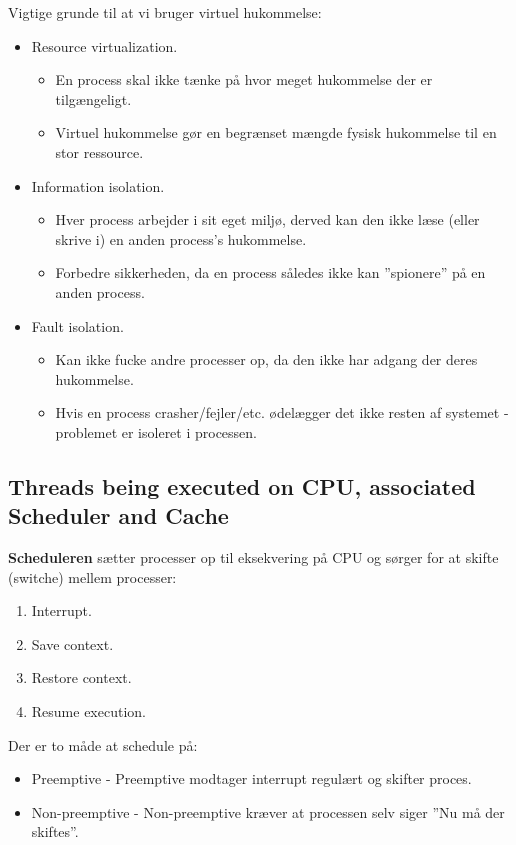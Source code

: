 Vigtige grunde til at vi bruger virtuel hukommelse:

\begin{itemize}
	\item Resource virtualization.
	\begin{itemize}
		\item En process skal ikke tænke på hvor meget hukommelse der er tilgængeligt.
		\item Virtuel hukommelse gør en begrænset mængde fysisk hukommelse til en stor ressource.
	\end{itemize}
	\item Information isolation.
	\begin{itemize}
		\item Hver process arbejder i sit eget miljø, derved kan den ikke læse (eller skrive i) en anden process's hukommelse.
		\item Forbedre sikkerheden, da en process således ikke kan ''spionere'' på en anden process.
	\end{itemize}
	\item Fault isolation.
	\begin{itemize}
		\item Kan ikke fucke andre processer op, da den ikke har adgang der deres hukommelse.
		\item Hvis en process crasher/fejler/etc. ødelægger det ikke resten af systemet - problemet er isoleret i processen.
	\end{itemize}
\end{itemize}

\subsection{Threads being executed on CPU, associated Scheduler and Cache}
\textbf{Scheduleren} sætter processer op til eksekvering på CPU og sørger for at skifte (switche) mellem processer:

\begin{enumerate}
	\item Interrupt.
	\item Save context.
	\item Restore context.
	\item Resume execution.
\end{enumerate}

Der er to måde at schedule på:

\begin{itemize}
	\item Preemptive - Preemptive modtager interrupt regulært og skifter proces.
	\item Non-preemptive - Non-preemptive kræver at processen selv siger ''Nu må der skiftes''.
\end{itemize}

